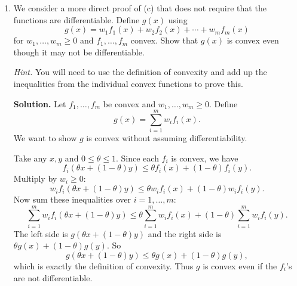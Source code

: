 \documentclass[11pt]{article}
\begin{document}
\begin{enumerate}[label=\textbf{(\alph*)}, leftmargin=1.2cm]
		\noindent\textit{Hint.} Consider the Hessian of $w_1 f_1(x) + \cdots + w_m f_m(x)$ and part (b).
		
		\noindent\textbf{Solution.}
		Let $f_1, \dots, f_m$ be convex and let $w_1, \dots, w_m \ge 0$. Define
		\[
		f(x) = w_1 f_1(x) + \cdots + w_m f_m(x).
		\]
		We show $f$ is convex using the definition.
		
		Take any $x, y$ and any $0 \le \theta \le 1$. Since each $f_i$ is convex,
		\[
		f_i(\theta x + (1-\theta) y) \le \theta f_i(x) + (1-\theta) f_i(y).
		\]
		Multiply both sides by $w_i \ge 0$:
		\[
		w_i f_i(\theta x + (1-\theta) y) \le w_i \theta f_i(x) + w_i (1-\theta) f_i(y).
		\]
		Now sum over $i = 1, \dots, m$:
		\[
		\sum_{i=1}^m w_i f_i(\theta x + (1-\theta) y)
		\le \theta \sum_{i=1}^m w_i f_i(x) + (1-\theta) \sum_{i=1}^m w_i f_i(y).
		\]
		But the left-hand side is $f(\theta x + (1-\theta) y)$ and the right-hand side is
		$\theta f(x) + (1-\theta) f(y)$. So
		\[
		f(\theta x + (1-\theta) y) \le \theta f(x) + (1-\theta) f(y),
		\]
		which is exactly convexity.
		
		\item We consider a more direct proof of (c) that does not require that the functions are differentiable. Define $g(x)$ using
		\[
		g(x) = w_1 f_1(x) + w_2 f_2(x) + \cdots + w_m f_m(x)
		\]
		for $w_1, \dots, w_m \ge 0$ and $f_1, \dots, f_m$ convex. Show that $g(x)$ is convex even though it may not be differentiable.
		
		\noindent\textit{Hint.} You will need to use the definition of convexity and add up the inequalities from the individual convex functions to prove this.
		
		\noindent\textbf{Solution.}
		Let $f_1, \dots, f_m$ be convex and $w_1, \dots, w_m \ge 0$. Define
		\[
		g(x) = \sum_{i=1}^m w_i f_i(x).
		\]
		We want to show $g$ is convex without assuming differentiability.
		
		Take any $x, y$ and $0 \le \theta \le 1$. Since each $f_i$ is convex, we have
		\[
		f_i(\theta x + (1-\theta) y) \le \theta f_i(x) + (1-\theta) f_i(y).
		\]
		Multiply by $w_i \ge 0$:
		\[
		w_i f_i(\theta x + (1-\theta) y) \le \theta w_i f_i(x) + (1-\theta) w_i f_i(y).
		\]
		Now sum these inequalities over $i = 1, \dots, m$:
		\[
		\sum_{i=1}^m w_i f_i(\theta x + (1-\theta) y)
		\le \theta \sum_{i=1}^m w_i f_i(x) + (1-\theta) \sum_{i=1}^m w_i f_i(y).
		\]
		The left side is $g(\theta x + (1-\theta) y)$ and the right side is
		$\theta g(x) + (1-\theta) g(y)$. So
		\[
		g(\theta x + (1-\theta) y) \le \theta g(x) + (1-\theta) g(y),
		\]
		which is exactly the definition of convexity. Thus $g$ is convex even if the $f_i$’s are not differentiable.
		

\end{enumerate}
\end{document}
